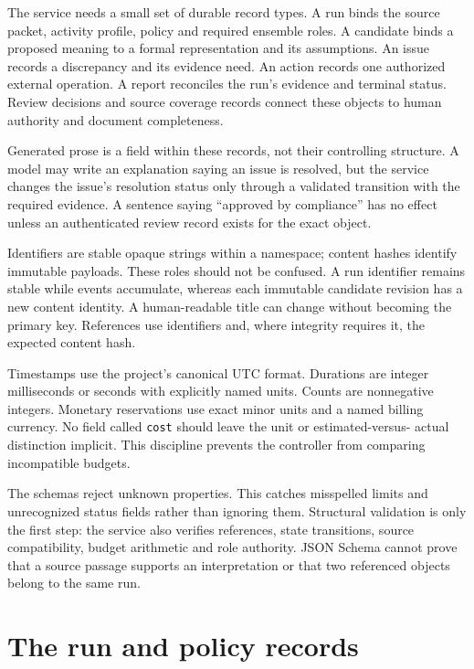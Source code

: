 The service needs a small set of durable record types. A run binds the source
packet, activity profile, policy and required ensemble roles. A candidate binds a
proposed meaning to a formal representation and its assumptions. An issue records
a discrepancy and its evidence need. An action records one authorized external
operation. A report reconciles the run's evidence and terminal status. Review
decisions and source coverage records connect these objects to human authority
and document completeness.

Generated prose is a field within these records, not their controlling structure.
A model may write an explanation saying an issue is resolved, but the service
changes the issue's resolution status only through a validated transition with
the required evidence. A sentence saying ``approved by compliance'' has no effect
unless an authenticated review record exists for the exact object.


Identifiers are stable opaque strings within a namespace; content hashes identify
immutable payloads. These roles should not be confused. A run identifier remains
stable while events accumulate, whereas each immutable candidate revision has a
new content identity. A human-readable title can change without becoming the
primary key. References use identifiers and, where integrity requires it, the
expected content hash.

Timestamps use the project's canonical UTC format. Durations are integer
milliseconds or seconds with explicitly named units. Counts are nonnegative
integers. Monetary reservations use exact minor units and a named billing
currency. No field called \texttt{cost} should leave the unit or estimated-versus-
actual distinction implicit. This discipline prevents the controller from
comparing incompatible budgets.

The schemas reject unknown properties. This catches misspelled limits and
unrecognized status fields rather than ignoring them. Structural validation is
only the first step: the service also verifies references, state transitions,
source compatibility, budget arithmetic and role authority. JSON Schema cannot
prove that a source passage supports an interpretation or that two referenced
objects belong to the same run.

\section{The run and policy records}
\label{merge:M08:02}


